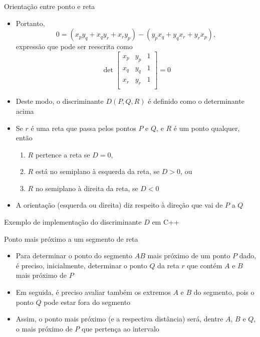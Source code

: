 \begin{frame}[fragile]{Orientação entre ponto e reta}
    \begin{itemize}
        \item Portanto,
        \[
            0 = (x_py_q + x_qy_r + x_ry_p) - (y_px_q + y_qx_r + y_rx_p),
        \]
        expressão que pode ser reescrita como
        \[
                \det \begin{bmatrix}
                x_p & y_p  & 1 \\
                x_q & y_q  & 1 \\
                x_r & y_r  & 1 \\
            \end{bmatrix} = 0
        \]
 
        \item Deste modo, o discriminante $D(P, Q, R)$ é definido como o determinante acima

        \item Se $r$ é uma reta que passa pelos pontos $P$ e $Q$, e $R$ é um ponto qualquer, então

        \begin{enumerate}
            \item $R$ pertence a reta se $D = 0$, 
            \item $R$ está no semiplano à esquerda da reta, se $D > 0$, ou 
            \item $R$ no semiplano à direita da reta, se $D < 0$
        \end{enumerate}
    
        \item A orientação (esquerda ou direita) diz respeito à direção que vai de $P$ a $Q$
    \end{itemize}

\end{frame}

\begin{frame}[fragile]{Exemplo de implementação do discriminante $D$ em C++}
\end{frame}

\begin{frame}[fragile]{Ponto mais próximo a um segmento de reta}

    \begin{itemize}
        \item Para determinar o ponto do segmento $AB$ mais próximo de um ponto $P$ dado, é 
            preciso, inicialmente, determinar o ponto $Q$ da reta $r$ que contém $A$ e $B$ mais
            próximo de $P$

        \item Em seguida, é preciso avaliar também os extremos $A$ e $B$ do segmento, pois o ponto 
            $Q$ pode estar fora do segmento

        \item Assim, o ponto mais próximo (e a respectiva distância) será, dentre $A$, $B$ e $Q$, 
            o mais próximo de $P$ que pertença ao intervalo

    \end{itemize}

\end{frame}

